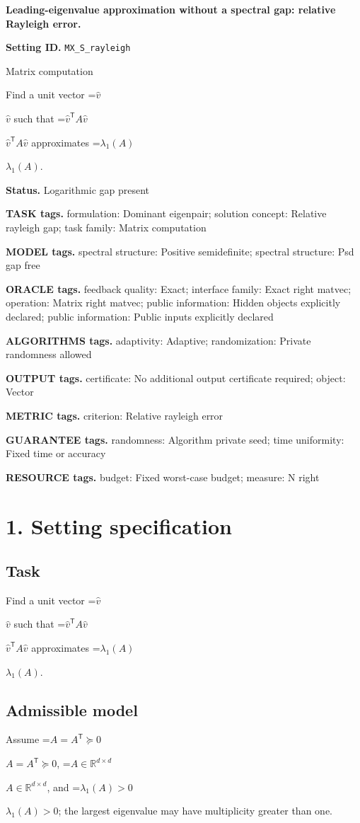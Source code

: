 \documentclass[10pt,a4paper]{article}
\newcommand{\AtlasMath}[1]{\par\begingroup\centering\setbox0=\hbox{$\displaystyle #1$}\ifdim\wd0>1.4\linewidth\typeout{ATLAS WIDE FORMULA: \the\wd0}\fi\ifdim\wd0>\linewidth\resizebox{\linewidth}{!}{\box0}\else\box0\fi\par\endgroup}
\newcommand{\AtlasInlineMath}[1]{\begingroup\setbox0=\hbox{$#1$}\ifdim\wd0>.4\linewidth\endgroup\AtlasMath{#1}\else\endgroup$#1$\fi}
\begin{document}
\raggedright

{\LARGE\bfseries\sffamily\color{AtlasNavy} Leading-eigenvalue approximation without a spectral gap: relative Rayleigh error.\par}\vspace{5pt}
\textbf{Setting ID.} \texttt{MX\_\allowbreak{}S\_\allowbreak{}rayleigh}

Matrix computation

Find a unit vector \AtlasInlineMath{\widehat{v}} such that \AtlasInlineMath{\widehat{v}^{\mathsf T}A\widehat{v}} approximates \AtlasInlineMath{\lambda_1(A)}.

\textbf{Status.} Logarithmic gap present

\textbf{TASK tags.} formulation: Dominant eigenpair; solution concept: Relative rayleigh gap; task family: Matrix computation

\textbf{MODEL tags.} spectral structure: Positive semidefinite; spectral structure: Psd gap free

\textbf{ORACLE tags.} feedback quality: Exact; interface family: Exact right matvec; operation: Matrix right matvec; public information: Hidden objects explicitly declared; public information: Public inputs explicitly declared

\textbf{ALGORITHMS tags.} adaptivity: Adaptive; randomization: Private randomness allowed

\textbf{OUTPUT tags.} certificate: No additional output certificate required; object: Vector

\textbf{METRIC tags.} criterion: Relative rayleigh error

\textbf{GUARANTEE tags.} randomness: Algorithm private seed; time uniformity: Fixed time or accuracy

\textbf{RESOURCE tags.} budget: Fixed worst-case budget; measure: N right

\section{1. Setting specification}
\subsection{Task}
Find a unit vector \AtlasInlineMath{\widehat{v}} such that \AtlasInlineMath{\widehat{v}^{\mathsf T}A\widehat{v}} approximates \AtlasInlineMath{\lambda_1(A)}.

\subsection{Admissible model}
Assume \AtlasInlineMath{A=A^{\mathsf T}\succeq0}, \AtlasInlineMath{A\in\mathbb{R}^{d\times d}}, and \AtlasInlineMath{\lambda_1(A)>0}; the largest eigenvalue may have multiplicity greater than one.
\end{document}
